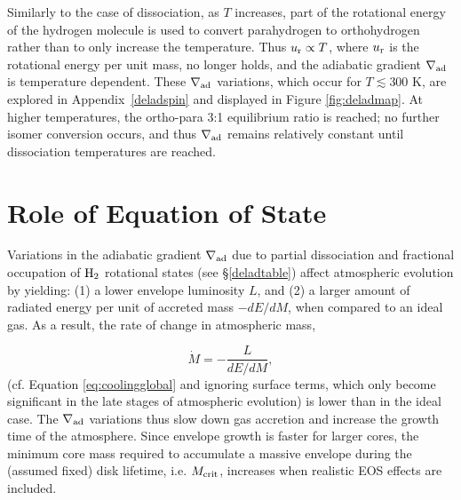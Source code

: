 \documentclass[apj]{emulateapj}
\newcommand{\delad}{\nabla_{\rm ad}}
\newcommand{\App}[1]{Appendix~\ref{#1}}
\begin{document}

Similarly to the case of dissociation, as $T$ increases, part of the rotational energy of the hydrogen molecule is used to convert parahydrogen to orthohydrogen rather than to only increase the temperature. Thus $u_{\rm r} \propto T$, where $u_{\rm r}$ is the rotational energy per unit mass, no longer holds, and the adiabatic gradient $\delad$ is temperature dependent. These $\delad$ variations, which occur for $T \lesssim 300$ K, are explored in \App{deladspin} and displayed in Figure \ref{fig:deladmap}. At higher temperatures, the ortho-para 3:1 equilibrium ratio is reached; no further isomer conversion occurs, and thus $\delad$ remains relatively constant until dissociation temperatures are reached. 



\section{Role of Equation of State}
\label{EOSeffects}

Variations in the adiabatic gradient $\delad$ due to partial dissociation and fractional occupation of $\rm{H}_2$ rotational states (see \S\ref{deladtable}) affect atmospheric evolution by yielding: (1) a lower envelope luminosity $L$, and (2) a larger amount of radiated energy per unit of accreted mass $-dE/dM$, when compared to an ideal gas. As a result, the rate of change in atmospheric mass,

\begin{equation}
\label{eq:dMdt}
\dot{M} = -\frac{L}{dE/dM},
\end{equation}
(cf. Equation \ref{eq:coolingglobal} and ignoring surface terms, which only become significant in the late stages of atmospheric evolution) is lower than in the ideal case. The $\delad$ variations thus slow down gas accretion and increase the growth time of the atmosphere. Since envelope growth is faster for larger cores, the minimum core mass required to accumulate a massive envelope during the (assumed fixed) disk lifetime, i.e. $M_{\rm crit}$, increases when realistic EOS effects are included.
\end{document}
